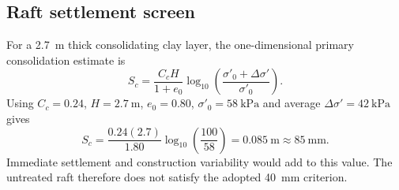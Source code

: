 \subsection{Raft settlement screen}
For a \SI{2.7}{\metre} thick consolidating clay layer, the one-dimensional primary consolidation
estimate is
\begin{equation}
S_c=\frac{C_c H}{1+e_0}\log_{10}\!\left(
\frac{\sigma'_0+\Delta\sigma'}{\sigma'_0}\right).
\label{eq:consolidation}
\end{equation}
Using $C_c=0.24$, $H=\SI{2.7}{\metre}$, $e_0=0.80$,
$\sigma'_0=\SI{58}{\kilo\pascal}$ and average
$\Delta\sigma'=\SI{42}{\kilo\pascal}$ gives
\begin{equation}
S_c=\frac{0.24(2.7)}{1.80}\log_{10}\!\left(\frac{100}{58}\right)
=\SI{0.085}{\metre}\approx\SI{85}{\milli\metre}.
\end{equation}
Immediate settlement and construction variability would add to this value. The untreated raft
therefore does not satisfy the adopted \SI{40}{\milli\metre} criterion.

